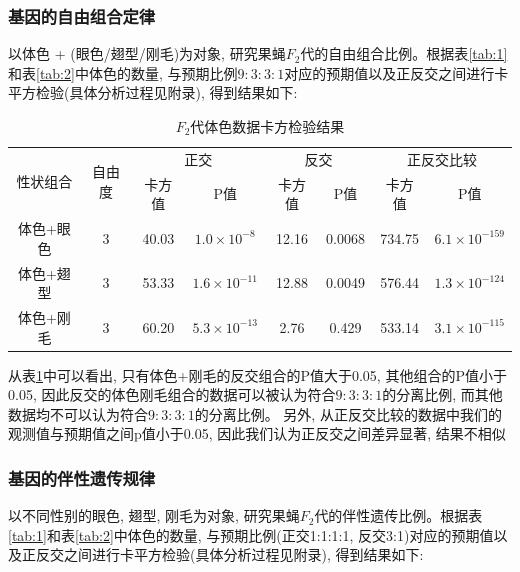 \documentclass[AutoFakeBold]{LZUThesis}
\begin{document}
\subsubsection{基因的自由组合定律}

以体色 + (眼色/翅型/刚毛)为对象, 研究果蝇$F_2$代的自由组合比例。根据表\ref{tab:1}和表\ref{tab:2}中体色的数量, 与预期比例$9:3:3:1$对应的预期值以及正反交之间进行卡平方检验(具体分析过程见附录), 得到结果如下:

\begin{table}[htbp]
    \centering
    \caption{$F_2$代体色数据卡方检验结果}
    \begin{tabular}{cccccccc}
        \toprule
        \multirow{2}{*}{性状组合} & \multirow{2}{*}{自由度} & \multicolumn{2}{c}{正交} & \multicolumn{2}{c}{反交} & \multicolumn{2}{c}{正反交比较} \\
        \cmidrule(lr){3-4} \cmidrule(lr){5-6} \cmidrule(lr){7-8}
        & & 卡方值 & P值 & 卡方值 & P值 & 卡方值 & P值 \\
        \midrule
        体色+眼色 & 3 & 40.03 & $1.0\times 10^{-8}$ & 12.16 & 0.0068 & 734.75 & $6.1\times 10^{-159}$ \\
        体色+翅型 & 3 & 53.33 & $1.6\times 10^{-11}$ & 12.88 & 0.0049 & 576.44 & $1.3\times 10^{-124}$ \\
        体色+刚毛 & 3 & 60.20 & $5.3\times 10^{-13}$ & 2.76 & 0.429 & 533.14 & $3.1\times 10^{-115}$ \\
        \bottomrule
    \end{tabular}
    \label{tab:5}
\end{table}

从表\ref{tab:5}中可以看出, 只有体色+刚毛的反交组合的P值大于0.05, 其他组合的P值小于0.05, 
因此反交的体色刚毛组合的数据可以被认为符合$9:3:3:1$的分离比例, 
而其他数据均不可以认为符合$9:3:3:1$的分离比例。
另外, 从正反交比较的数据中我们的观测值与预期值之间p值小于0.05, 因此我们认为正反交之间差异显著, 结果不相似

\subsubsection{基因的伴性遗传规律}

以不同性别的眼色, 翅型, 刚毛为对象, 研究果蝇$F_2$代的伴性遗传比例。根据表\ref{tab:1}和表\ref{tab:2}中体色的数量, 与预期比例(正交1:1:1:1, 反交3:1)对应的预期值以及正反交之间进行卡平方检验(具体分析过程见附录), 得到结果如下:
\end{document}
